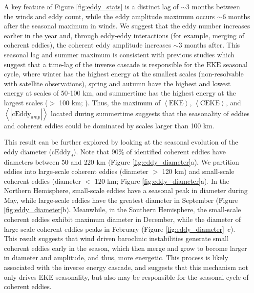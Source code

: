 \documentclass[draft,linenumbers]{agujournal2019}
\newcommand{\EKE}{\textrm{EKE}}
\newcommand{\CEKE}{\textrm{CEKE}}
\newcommand{\cEddy}{\textrm{cEddy}}
\begin{document}
	A key feature of Figure \ref{fig:eddy_stats} is a distinct lag of $\sim$3 months between the winds and eddy count, while the eddy amplitude maximum occurs $\sim$6 months after the seasonal maximum in winds. 
	We suggest that the eddy number increases earlier in the year and, through eddy-eddy interactions (for example, merging of coherent eddies), the coherent eddy amplitude increases $\sim$3 months after. This seasonal lag and summer maximum is consistent with previous studies which suggest that a time-lag of the inverse cascade \citep{Sasaki_seasonal_2014, Qiu_seasonal_2014} is responsible for the $\EKE$ seasonal cycle, where winter has the highest energy at the smallest scales (non-resolvable with satellite observations), spring and autumn have the highest and lowest energy at scales of 50-100 km, and summertime has the highest energy at the largest scales ($>$ 100 km; \citealp{Uchida_Seasonality_2017}). 
	Thus, the maximum of $\left<\EKE\right>$, $\left<\CEKE\right>$, and $\left<|\cEddy_{amp}|\right>$ located during summertime suggests that the seasonality of eddies and coherent eddies could be dominated by scales larger than 100 km.

	This result can be further explored by looking at the seasonal evolution of the eddy diameter ($\cEddy_d$). 
	Note that 90\% of identified coherent eddies have diameters between 50 and 220 km (Figure \ref{fig:eddy_diameter}a). We partition eddies into large-scale coherent eddies (diameter $>$ 120 km) and  small-scale coherent eddies (diameter $<$ 120 km; Figure \ref{fig:eddy_diameter}a). 
	In the Northern Hemisphere, small-scale eddies have a seasonal peak in diameter during May, while large-scale eddies have the greatest diameter in September (Figure \ref{fig:eddy_diameter}b).
	Meanwhile, in the Southern Hemisphere, the small-scale coherent eddies exhibit maximum diameter in December, while the diameter of large-scale coherent eddies peaks in February (Figure \ref{fig:eddy_diameter}~c). 
	This result suggests that wind driven baroclinic instabilities generate small coherent eddies early in the season, which then merge and grow to become larger in diameter and amplitude, and thus, more energetic. 
	This process is likely associated with the inverse energy cascade, and suggests that this mechanism not only drives $\EKE$ seasonality, but also may be responsible for the seasonal cycle of coherent eddies. 
\end{document}
